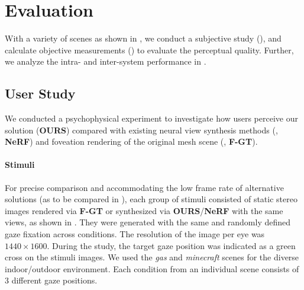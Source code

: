 \section{Evaluation}
\label{sec:result}
% 
With a variety of scenes as shown in , we conduct a subjective study (), and calculate objective measurements () to evaluate the perceptual quality.
Further, we analyze the intra- and inter-system performance in .

\subsection{User Study}
\label{sec:study:user}
We conducted a psychophysical experiment to investigate how users perceive our solution ({\bf OURS}) compared with existing neural view synthesis methods (\cite{mildenhall2020nerf}, {\bf NeRF}) and foveation rendering of the original mesh scene (\cite{perry2002gaze}, {\bf F-GT}).


\paragraph{Stimuli}
For precise comparison and accommodating the low frame rate of alternative solutions (as to be compared in ), each group of stimuli consisted of static stereo images rendered via {\bf F-GT} or synthesized via {\bf OURS}/{\bf NeRF} with the same views, as shown in .
They were generated with the same and randomly defined gaze fixation across conditions.
The resolution of the image per eye was $1440 \times 1600$. 
During the study, the target gaze position was indicated as a green cross on the stimuli images.
We used the {\it gas} and {\it minecraft} scenes for the diverse indoor/outdoor environment.
Each condition from an individual scene consists of  $3$ different gaze positions.

